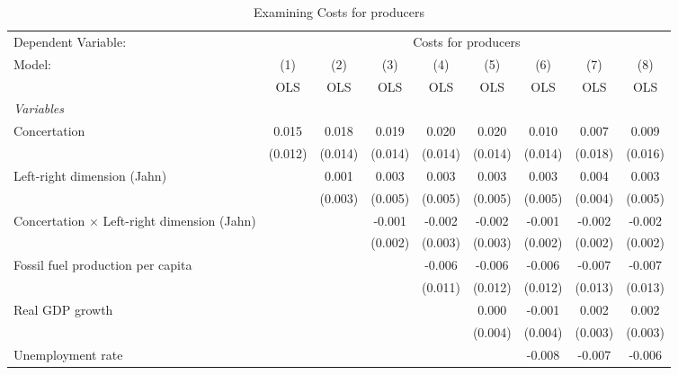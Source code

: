 
\begin{table}[htbp]
   \caption{Examining Costs for producers}
   \centering
   \begin{tabular}{lcccccccc}
      \toprule
      Dependent Variable: & \multicolumn{8}{c}{Costs for producers}\\
      Model:                                             & (1)     & (2)     & (3)     & (4)     & (5)     & (6)     & (7)     & (8)\\  
                                                         &  OLS    & OLS     & OLS     & OLS     & OLS     & OLS     & OLS     & OLS\\  
      \midrule
      \emph{Variables}\\
      Concertation                                       & 0.015   & 0.018   & 0.019   & 0.020   & 0.020   & 0.010   & 0.007   & 0.009\\   
                                                         & (0.012) & (0.014) & (0.014) & (0.014) & (0.014) & (0.014) & (0.018) & (0.016)\\   
      Left-right dimension (Jahn)                        &         & 0.001   & 0.003   & 0.003   & 0.003   & 0.003   & 0.004   & 0.003\\   
                                                         &         & (0.003) & (0.005) & (0.005) & (0.005) & (0.005) & (0.004) & (0.005)\\   
      Concertation $\times$ Left-right dimension (Jahn)  &         &         & -0.001  & -0.002  & -0.002  & -0.001  & -0.002  & -0.002\\   
                                                         &         &         & (0.002) & (0.003) & (0.003) & (0.002) & (0.002) & (0.002)\\   
      Fossil fuel production per capita                  &         &         &         & -0.006  & -0.006  & -0.006  & -0.007  & -0.007\\   
                                                         &         &         &         & (0.011) & (0.012) & (0.012) & (0.013) & (0.013)\\   
      Real GDP growth                                    &         &         &         &         & 0.000   & -0.001  & 0.002   & 0.002\\   
                                                         &         &         &         &         & (0.004) & (0.004) & (0.003) & (0.003)\\   
      Unemployment rate                                  &         &         &         &         &         & -0.008  & -0.007  & -0.006\\   

\end{tabular}
\end{table}
